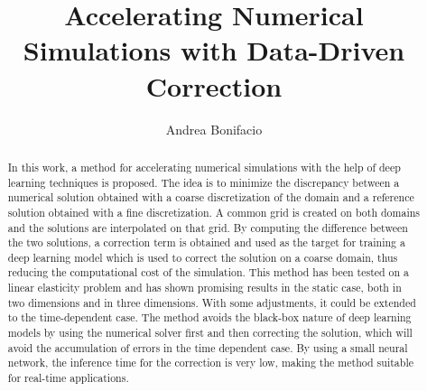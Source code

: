 \documentclass{article}
\begin{document}
\title{Accelerating Numerical Simulations with Data-Driven Correction}

\author{Andrea Bonifacio}

\maketitle

\begin{abstract}
  In this work, a method for accelerating numerical simulations with the help of deep learning techniques is proposed. The idea is to minimize the discrepancy between a numerical solution obtained with a coarse discretization of the domain and a reference solution obtained with a fine discretization. A common grid is created on both domains and the solutions are interpolated on that grid. By computing the difference between the two solutions, a correction term is obtained and used as the target for training a deep learning model which is used to correct the solution on a coarse domain, thus reducing the computational cost of the simulation. This method has been tested on a linear elasticity problem and has shown promising results in the static case, both in two dimensions and in three dimensions. With some adjustments, it could be extended to the time-dependent case. The method avoids the black-box nature of deep learning models by using the numerical solver first and then correcting the solution, which will avoid the accumulation of errors in the time dependent case. By using a small neural network, the inference time for the correction is very low, making the method suitable for real-time applications. 
\end{abstract}
\end{document}
